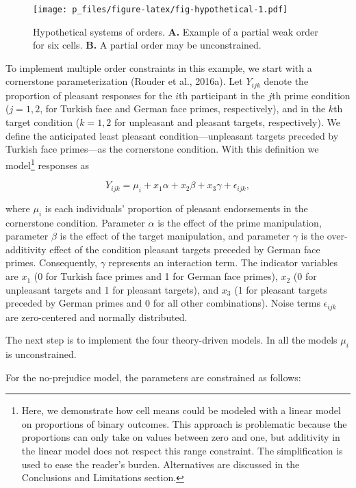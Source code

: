 \documentclass[english,,man]{apa6}
\let\rmarkdownfootnote\footnote%
\def\footnote{\protect\rmarkdownfootnote}
\begin{document}
\begin{figure}
\centering
\texttt{[image: p\_files/figure-latex/fig-hypothetical-1.pdf]}
\caption{\label{fig:fig-hypothetical}Hypothetical systems of orders. \textbf{A.} Example of a partial weak order for six cells. \textbf{B.} A partial order may be unconstrained.}
\end{figure}

To implement multiple order constraints in this example, we start with a cornerstone parameterization (Rouder et al., 2016a). Let \(Y_{ijk}\) denote the proportion of pleasant responses for the \(i\)th participant in the \(j\)th prime condition (\(j=1, 2\), for Turkish face and German face primes, respectively), and in the \(k\)th target condition (\(k = 1, 2\) for unpleasant and pleasant targets, respectively). We define the anticipated least pleasant condition---unpleasant targets preceded by Turkish face primes---as the cornerstone condition. With this definition we model\footnote{Here, we demonstrate how cell means could be modeled with a linear model on proportions of binary outcomes. This approach is problematic because the proportions can only take on values between zero and one, but additivity in the linear model does not respect this range constraint. The simplification is used to ease the reader's burden. Alternatives are discussed in the Conclusions and Limitations section.} responses as

\[Y_{ijk} = \mu_i + x_{1} \alpha + x_{2} \beta + x_{3} \gamma + \epsilon_{ijk},\]

where \(\mu_i\) is each individuals' proportion of pleasant endorsements in the cornerstone condition. Parameter \(\alpha\) is the effect of the prime manipulation, parameter \(\beta\) is the effect of the target manipulation, and parameter \(\gamma\) is the over-additivity effect of the condition pleasant targets preceded by German face primes. Consequently, \(\gamma\) represents an interaction term. The indicator variables are \(x_1\) (0 for Turkish face primes and 1 for German face primes), \(x_2\) (0 for unpleasant targets and 1 for pleasant targets), and \(x_3\) (1 for pleasant targets preceded by German primes and 0 for all other combinations). Noise terms \(\epsilon_{ijk}\) are zero-centered and normally distributed.

The next step is to implement the four theory-driven models. In all the models \(\mu_i\) is unconstrained.

For the no-prejudice model, the parameters are constrained as follows:
\end{document}

